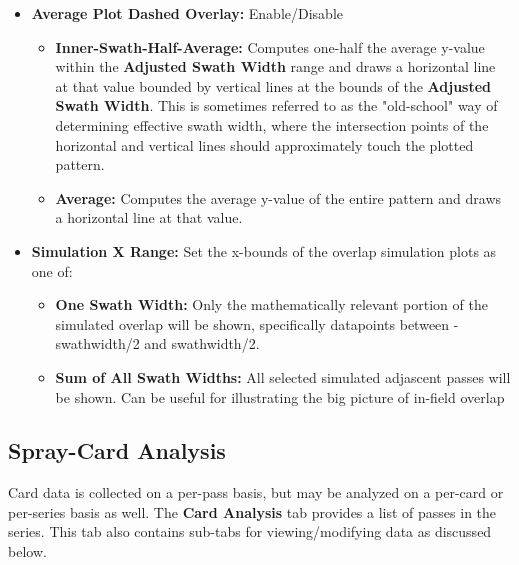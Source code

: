 \documentclass[10pt,letterpaper,titlepage]{article}
\begin{document}
    \begin{itemize}
        \item \textbf{Average Plot Dashed Overlay:} Enable/Disable
        \begin{itemize}
            \item \textbf{Inner-Swath-Half-Average:} Computes one-half the average y-value within the \textbf{Adjusted Swath Width} range and draws a horizontal line at that value bounded by vertical lines at the bounds of the \textbf{Adjusted Swath Width}. This is sometimes referred to as the "old-school" way of determining effective swath width, where the intersection points of the horizontal and vertical lines should approximately touch the plotted pattern.
            \item \textbf{Average:} Computes the average y-value of the entire pattern and draws a horizontal line at that value.
        \end{itemize}
        \item \textbf{Simulation X Range:} Set the x-bounds of the overlap simulation plots as one of:
        \begin{itemize}
            \item \textbf{One Swath Width:} Only the mathematically relevant portion of the simulated overlap will be shown, specifically datapoints between -swathwidth/2 and swathwidth/2.
            \item \textbf{Sum of All Swath Widths:} All selected simulated adjascent passes will be shown. Can be useful for illustrating the big picture of in-field overlap
        \end{itemize}
    \end{itemize}

    \newpage

    \subsection{Spray-Card Analysis}
    Card data is collected on a per-pass basis, but may be analyzed on a per-card or per-series basis as well. The \textbf{Card Analysis} tab provides a list of passes in the series. This tab also contains sub-tabs for viewing/modifying data as discussed below.
\end{document}
